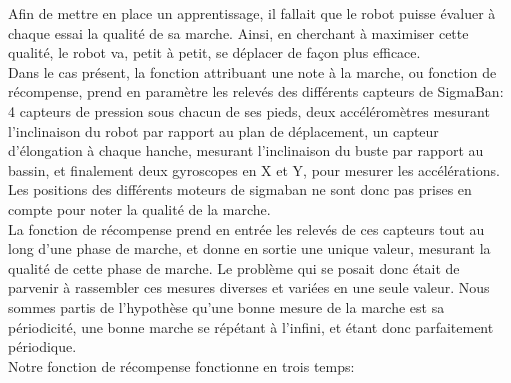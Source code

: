 \documentclass[11pt]{article}
\begin{document}
Afin de mettre en place un apprentissage, il fallait que le robot puisse évaluer à chaque essai la qualité de sa marche. Ainsi, en cherchant à maximiser cette qualité, le robot va, petit à petit, se déplacer de façon plus efficace.\\
Dans le cas présent, la fonction attribuant une note à la marche, ou fonction de récompense, prend en paramètre les relevés des différents capteurs de SigmaBan: 4 capteurs de pression sous chacun de ses pieds, deux accéléromètres mesurant l'inclinaison du robot par rapport au plan de déplacement, un capteur d'élongation à chaque hanche, mesurant l'inclinaison du buste par rapport au bassin, et finalement deux gyroscopes en X et Y, pour mesurer les accélérations. Les positions des différents moteurs de sigmaban ne sont donc pas prises en compte pour noter la qualité de la marche.\\
La fonction de récompense prend en entrée les relevés de ces capteurs tout au long d'une phase de marche, et donne en sortie une unique valeur, mesurant la qualité de cette phase de marche. Le problème qui se posait donc était de parvenir à rassembler ces mesures diverses et variées en une seule valeur. Nous sommes partis de l'hypothèse qu'une bonne mesure de la marche est sa périodicité, une bonne marche se répétant à l'infini, et étant donc parfaitement périodique.\\
Notre fonction de récompense fonctionne en trois temps:
\end{document}

